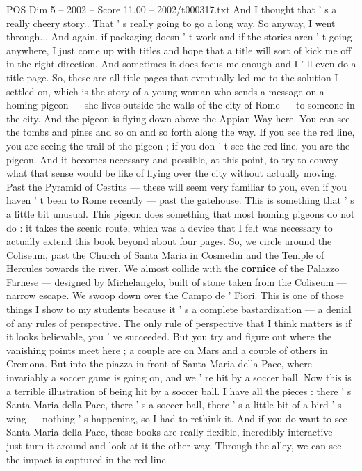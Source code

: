 \begin{textsample}{POS Dim 5 – 2002 – Score 11.00 – 2002/t000317.txt}
And I thought that ' s a really cheery story..
That ' s really going to go a long way.
So anyway, I went through...
And again, if packaging doesn ' t work and if the stories aren ' t going anywhere, I just come up with titles and hope that a title will sort of kick me off in the right direction.
And sometimes it does focus me enough and I ' ll even do a title page.
So, these are all title pages that eventually led me to the solution I settled on, which is the story of a young woman who sends a message on a homing pigeon — she lives outside the walls of the city of Rome — to someone in the city.
And the pigeon is flying down above the Appian Way here.
You can see the tombs and pines and so on and so forth along the way.
If you see the red line, you are seeing the trail of the pigeon ; if you don ' t see the red line, you are the pigeon.
And it becomes necessary and possible, at this point, to try to convey what that sense would be like of flying over the city without actually moving.
Past the Pyramid of Cestius — these will seem very familiar to you, even if you haven ' t been to Rome recently — past the gatehouse.
This is something that ' s a little bit unusual.
This pigeon does something that most homing pigeons do not do : it takes the scenic route, which was a device that I felt was necessary to actually extend this book beyond about four pages.
So, we circle around the Coliseum, past the Church of Santa Maria in Cosmedin and the Temple of Hercules towards the river.
We almost collide with the \textbf{cornice} of the Palazzo Farnese — designed by Michelangelo, built of stone taken from the Coliseum — narrow escape.
We swoop down over the Campo de ' Fiori.
This is one of those things I show to my students because it ' s a complete bastardization — a denial of any rules of perspective.
The only rule of perspective that I think matters is if it looks believable, you ' ve succeeded.
But you try and figure out where the vanishing points meet here ; a couple are on Mars and a couple of others in Cremona.
But into the piazza in front of Santa Maria della Pace, where invariably a soccer game is going on, and we ' re hit by a soccer ball.
Now this is a terrible illustration of being hit by a soccer ball.
I have all the pieces : there ' s Santa Maria della Pace, there ' s a soccer ball, there ' s a little bit of a bird ' s wing — nothing ' s happening, so I had to rethink it.
And if you do want to see Santa Maria della Pace, these books are really flexible, incredibly interactive — just turn it around and look at it the other way.
Through the alley, we can see the impact is captured in the red line.

\end{textsample}
